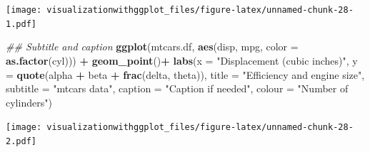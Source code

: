 \documentclass[]{krantz}
\makeatletter
\newenvironment{Shaded}{\begin{snugshade}}{\end{snugshade}}
\newcommand{\CommentTok}[1]{\textcolor[rgb]{0.56,0.35,0.01}{\textit{#1}}}
\newcommand{\DataTypeTok}[1]{\textcolor[rgb]{0.13,0.29,0.53}{#1}}
\newcommand{\KeywordTok}[1]{\textcolor[rgb]{0.13,0.29,0.53}{\textbf{#1}}}
\newcommand{\NormalTok}[1]{#1}
\newcommand{\OperatorTok}[1]{\textcolor[rgb]{0.81,0.36,0.00}{\textbf{#1}}}
\newcommand{\StringTok}[1]{\textcolor[rgb]{0.31,0.60,0.02}{#1}}
\newenvironment{kframe}{%
\medskip{}
\setlength{\fboxsep}{.8em}
 \def\at@end@of@kframe{}%
 \ifinner\ifhmode%
  \def\at@end@of@kframe{\end{minipage}}%
  \begin{minipage}{\columnwidth}%
 \fi\fi%
 \def\FrameCommand##1{\hskip\@totalleftmargin \hskip-\fboxsep
 \colorbox{shadecolor}{##1}\hskip-\fboxsep
     \hskip-\linewidth \hskip-\@totalleftmargin \hskip\columnwidth}%
 \MakeFramed {\advance\hsize-\width
   \@totalleftmargin\z@ \linewidth\hsize
   \@setminipage}}%
 {\par\unskip\endMakeFramed%
 \at@end@of@kframe}
\renewenvironment{Shaded}{\begin{kframe}}{\end{kframe}}
\makeatother
\begin{document}
\begin{Shaded}
\end{Shaded}

\texttt{[image: visualizationwithggplot\_files/figure-latex/unnamed-chunk-28-1.pdf]}

\begin{Shaded}
\begin{Highlighting}[]
\CommentTok{## Subtitle and caption}
\KeywordTok{ggplot}\NormalTok{(mtcars.df, }\KeywordTok{aes}\NormalTok{(disp,  mpg, }\DataTypeTok{color =} \KeywordTok{as.factor}\NormalTok{(cyl))) }\OperatorTok{+}\StringTok{ }
\StringTok{  }\KeywordTok{geom_point}\NormalTok{()}\OperatorTok{+}
\StringTok{  }\KeywordTok{labs}\NormalTok{(}\DataTypeTok{x =} \StringTok{"Displacement (cubic inches)"}\NormalTok{, }\DataTypeTok{y =} \KeywordTok{quote}\NormalTok{(alpha }\OperatorTok{+}\StringTok{ }\NormalTok{beta }\OperatorTok{+}\StringTok{ }\KeywordTok{frac}\NormalTok{(delta, theta)), }
       \DataTypeTok{title =} \StringTok{"Efficiency and engine size"}\NormalTok{, }\DataTypeTok{subtitle =} \StringTok{"mtcars data"}\NormalTok{,}
       \DataTypeTok{caption =} \StringTok{"Caption if needed"}\NormalTok{,}
       \DataTypeTok{colour =} \StringTok{"Number of cylinders"}\NormalTok{)}
\end{Highlighting}
\end{Shaded}

\texttt{[image: visualizationwithggplot\_files/figure-latex/unnamed-chunk-28-2.pdf]}
\end{document}
